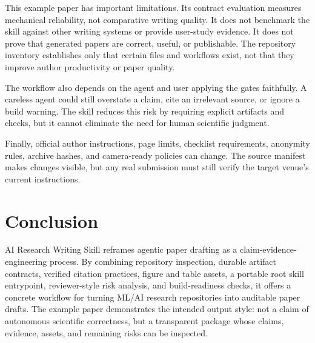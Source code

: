 \documentclass{article}
\begin{document}
This example paper has important limitations. Its contract evaluation measures mechanical reliability, not comparative writing quality. It does not benchmark the skill against other writing systems or provide user-study evidence. It does not prove that generated papers are correct, useful, or publishable. The repository inventory establishes only that certain files and workflows exist, not that they improve author productivity or paper quality.

The workflow also depends on the agent and user applying the gates faithfully. A careless agent could still overstate a claim, cite an irrelevant source, or ignore a build warning. The skill reduces this risk by requiring explicit artifacts and checks, but it cannot eliminate the need for human scientific judgment.

Finally, official author instructions, page limits, checklist requirements, anonymity rules, archive hashes, and camera-ready policies can change. The source manifest makes changes visible, but any real submission must still verify the target venue's current instructions.

\section{Conclusion}

AI Research Writing Skill reframes agentic paper drafting as a claim-evidence-engineering process. By combining repository inspection, durable artifact contracts, verified citation practices, figure and table assets, a portable root skill entrypoint, reviewer-style risk analysis, and build-readiness checks, it offers a concrete workflow for turning ML/AI research repositories into auditable paper drafts. The example paper demonstrates the intended output style: not a claim of autonomous scientific correctness, but a transparent package whose claims, evidence, assets, and remaining risks can be inspected.



\end{document}
